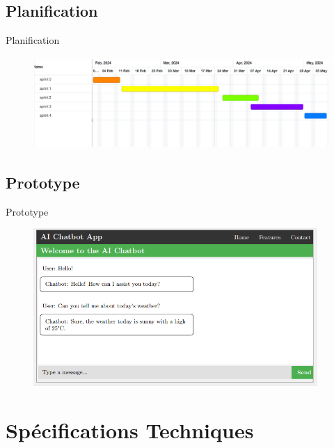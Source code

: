 \documentclass[aspectratio=169]{beamer}
\begin{document}
\subsection{Planification}
\begin{frame}{Planification}

    \begin{figure}[htpb]
        \centering
        \includegraphics[height=3.5cm]{assets/images/gant-prev.png}
    \end{figure}
\end{frame}




\subsection{Prototype}
\begin{frame}{Prototype}

    \begin{figure}[htpb]
        \centering
        \includegraphics[height=6cm]{assets/images/prototype.png}
    \end{figure}

\end{frame}



\section{Spécifications Techniques}
\end{document}

